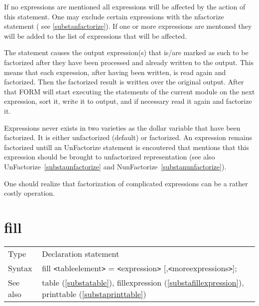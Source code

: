 \noindent If no expressions are mentioned all expressions will be affected 
by the action of this statement. One may exclude certain expressions with 
the nfactorize statement ( see \ref{substanfactorize}). If one or more 
expressions are mentoned they will be added to the list of expressions that 
will be affected.

\noindent The statement causes the output expression(s) that is/are marked 
as such to be factorized after they have been processed and already written 
to the output. This means that each expression, after having been written, 
is read again and factorized. Then the factorized result is written over 
the original output. After that FORM will start executing the statements of 
the current module on the next expression, sort it, write it to output, and 
if necessary read it again and factorize it.

\noindent Expressions never exists in two varieties as the dollar variable 
that have been factorized. It is either unfactorized (default) or 
factorized. An expression remains factorized untill an UnFactorize 
statement is encoutered that mentions that this expression should be 
brought to unfactorized representation (see also 
UnFactorize~\ref{substaunfactorize} and 
NunFactorize~\ref{substanunfactorize}).

\noindent One should realize that factorization of complicated expressions 
can be a rather costly operation.

\vspace{10mm}


\section{fill}
\label{substafill}

\noindent \begin{tabular}{ll}
Type & Declaration statement\\
Syntax & fill {\tt<}tableelement{\tt>} = {\tt<}expression{\tt>} [,{\tt<}moreexpressions{\tt>}];
\\ See also & table (\ref{substatable}), 
                fillexpression (\ref{substafillexpression}),
                printtable (\ref{substaprinttable})
\end{tabular} \vspace{4mm}

